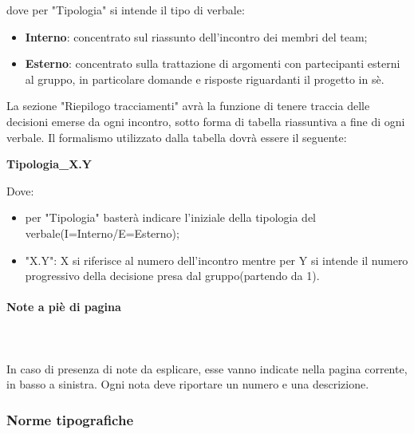 		dove per "Tipologia" si intende il tipo di verbale:
		\begin{itemize}
			\item \textbf{Interno}: concentrato sul riassunto dell'incontro dei membri del team;
			\item \textbf{Esterno}: concentrato sulla trattazione di argomenti con partecipanti esterni al gruppo, in particolare domande e risposte riguardanti il progetto in sè.
		\end{itemize}
		La sezione "Riepilogo tracciamenti" avrà la funzione di tenere traccia delle decisioni emerse da ogni incontro, sotto forma di tabella riassuntiva a fine di ogni verbale. Il formalismo utilizzato dalla tabella dovrà essere il seguente: \newline \newline
		\centerline{\textbf{Tipologia\_X.Y}} \newline \newline
		Dove:
		\begin{itemize}
			\item per "Tipologia" basterà indicare l'iniziale della tipologia del verbale(I=Interno/E=Esterno);
			\item "X.Y": X si riferisce al numero dell'incontro mentre per Y si intende il numero progressivo della decisione presa dal gruppo(partendo da 1).
		\end{itemize}	
		\paragraph{Note a piè di pagina} \mbox{}\\ \mbox{}\\
		In caso di presenza di note da esplicare, esse vanno indicate nella pagina corrente, in basso a sinistra. Ogni nota deve riportare un numero e una descrizione.		
	\subsubsection{Norme tipografiche}
